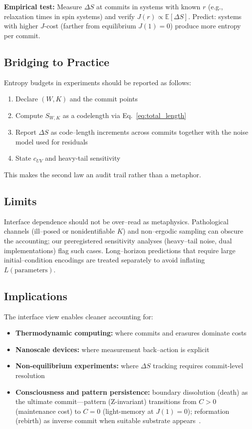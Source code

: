 \documentclass[11pt,letterpaper]{article}
\theoremstyle{definition}
\theoremstyle{remark}
\begin{document}
\textbf{Empirical test:} Measure \(\Delta S\) at commits in systems with known \(r\) (e.g., relaxation times in spin systems) and verify \(J(r)\propto \mathbb{E}[\Delta S]\). Predict: systems with higher \(J\)-cost (farther from equilibrium \(J(1)=0\)) produce more entropy per commit.

\subsection{Bridging to Practice}

Entropy budgets in experiments should be reported as follows: 
\begin{enumerate}[label=(\roman*)]
  \item Declare \((W,K)\) and the commit points
  \item Compute \(S_{W,K}\) as a codelength via Eq.~\eqref{eq:total_length}
  \item Report \(\Delta S\) as code--length increments across commits together with the noise model used for residuals
  \item State \(c_{UV}\) and heavy-tail sensitivity
\end{enumerate}
This makes the second law an audit trail rather than a metaphor.

\subsection{Limits}

Interface dependence should not be over--read as metaphysics. Pathological channels (ill--posed or nonidentifiable \(K\)) and non--ergodic sampling can obscure the accounting; our preregistered sensitivity analyses (heavy--tail noise, dual implementations) flag such cases. Long--horizon predictions that require large initial--condition encodings are treated separately to avoid inflating \(L(\text{parameters})\).

\subsection{Implications}

The interface view enables cleaner accounting for:
\begin{itemize}[leftmargin=*]
  \item \textbf{Thermodynamic computing:} where commits and erasures dominate costs
  \item \textbf{Nanoscale devices:} where measurement back--action is explicit
  \item \textbf{Non-equilibrium experiments:} where \(\Delta S\) tracking requires commit-level resolution
  \item \textbf{Consciousness and pattern persistence:} boundary dissolution (death) as the ultimate commit---pattern (Z-invariant) transitions from \(C>0\) (maintenance cost) to \(C=0\) (light-memory at \(J(1)=0\)); reformation (rebirth) as inverse commit when suitable substrate appears~\cite{Afterlife_Theorem}.
\end{itemize}
\end{document}
